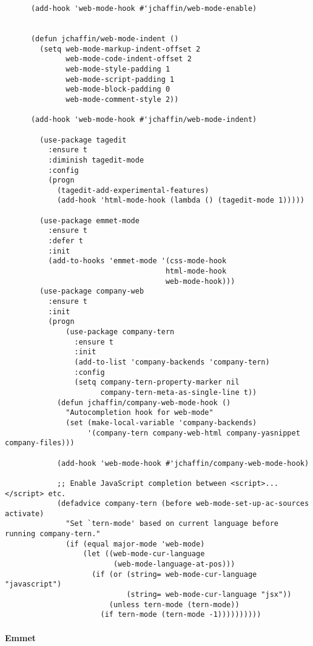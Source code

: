 \documentclass[11pt]{article}
\begin{document}
\begin{verbatim}
      (add-hook 'web-mode-hook #'jchaffin/web-mode-enable)


      (defun jchaffin/web-mode-indent ()
        (setq web-mode-markup-indent-offset 2
              web-mode-code-indent-offset 2
              web-mode-style-padding 1
              web-mode-script-padding 1
              web-mode-block-padding 0
              web-mode-comment-style 2))

      (add-hook 'web-mode-hook #'jchaffin/web-mode-indent)

        (use-package tagedit
          :ensure t
          :diminish tagedit-mode
          :config
          (progn
            (tagedit-add-experimental-features)
            (add-hook 'html-mode-hook (lambda () (tagedit-mode 1)))))
      
        (use-package emmet-mode
          :ensure t
          :defer t
          :init
          (add-to-hooks 'emmet-mode '(css-mode-hook
                                     html-mode-hook
                                     web-mode-hook)))
        (use-package company-web
          :ensure t
          :init
          (progn
              (use-package company-tern
                :ensure t
                :init
                (add-to-list 'company-backends 'company-tern)
                :config
                (setq company-tern-property-marker nil
                      company-tern-meta-as-single-line t))
            (defun jchaffin/company-web-mode-hook ()
              "Autocompletion hook for web-mode"
              (set (make-local-variable 'company-backends)
                   '(company-tern company-web-html company-yasnippet company-files)))
      
            (add-hook 'web-mode-hook #'jchaffin/company-web-mode-hook)
      
            ;; Enable JavaScript completion between <script>...</script> etc.
            (defadvice company-tern (before web-mode-set-up-ac-sources activate)
              "Set `tern-mode' based on current language before running company-tern."
              (if (equal major-mode 'web-mode)
                  (let ((web-mode-cur-language
                         (web-mode-language-at-pos)))
                    (if (or (string= web-mode-cur-language "javascript")
                            (string= web-mode-cur-language "jsx"))
                        (unless tern-mode (tern-mode))
                      (if tern-mode (tern-mode -1))))))))))
\end{verbatim}

\paragraph*{Emmet}
\label{sec:org991813f}
\end{document}
